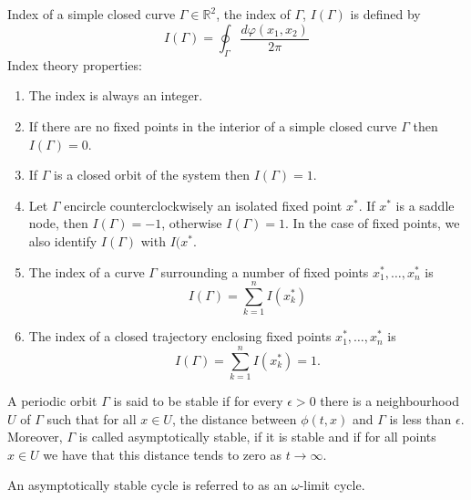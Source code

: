 Index of a simple closed curve $\Gamma \in \mathbb R^2$, the index of $\Gamma$, $I(\Gamma)$ is defined by
\begin{equation}
    I(\Gamma) = \oint_{\Gamma} \frac{d \varphi(x_1, x_2)}{2 \pi}
\end{equation}
Index theory properties:
\begin{enumerate}
    \item The index is always an integer.
    \item If there are no fixed points in the interior of a simple closed curve $\Gamma$ then $I(\Gamma) = 0$.
    \item If $\Gamma$ is a closed orbit of the system then $I(\Gamma) = 1$.
    \item Let $\Gamma$ encircle counterclockwisely an isolated fixed point $x^\ast$. If $x^\ast$ is a saddle node, then $I(\Gamma) = -1$, otherwise $I(\Gamma) = 1$. In the case of fixed points, we also identify $I(\Gamma)$ with $I(x^\ast$.
    \item The index of a curve $\Gamma$ surrounding a number of fixed points $x_1^\ast, \dotsc, x_n^\ast$ is
        \begin{equation}
            I(\Gamma) = \sum_{k = 1}^n I(x_k^\ast)
        \end{equation}
    \item The index of a closed trajectory enclosing fixed points $x_1^\ast, \dotsc, x_n^\ast$ is
        \begin{equation}
            I(\Gamma) = \sum_{k = 1}^n I(x_k^\ast) = 1.
        \end{equation}
\end{enumerate}

\begin{definition}
    A periodic orbit $\Gamma$ is said to be stable if for every $\epsilon > 0$ there is a neighbourhood $U$ of $\Gamma$ such that for all $x \in U$, the distance between $\phi(t, x)$ and $\Gamma$ is less than $\epsilon$. Moreover, $\Gamma$ is called asymptotically stable, if it is stable and if for all points $x \in U$ we have that this distance tends to zero as $t \to \infty$.
\end{definition}

An asymptotically stable cycle is referred to as an $\omega$-limit cycle.